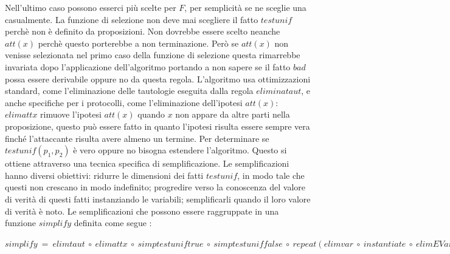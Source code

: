 \documentclass[12pt]{article}
\begin{document}
 Nell'ultimo caso possono esserci più scelte per $F$, per semplicità se ne sceglie una casualmente. La funzione di selezione non deve mai scegliere il fatto $testunif$ perchè non è definito da proposizioni. Non dovrebbe essere scelto neanche $att(x)$ perchè questo porterebbe a non terminazione. Però se $att(x)$ non venisse selezionata nel primo caso della funzione di selezione questa rimarrebbe invariata dopo l'applicazione dell'algoritmo portando a non sapere se il fatto $bad$ possa essere derivabile oppure no da questa regola. L'algoritmo usa ottimizzazioni standard, come l'eliminazione delle tautologie eseguita dalla regola $eliminataut$, e anche specifiche per i protocolli, come l'eliminazione dell'ipotesi $att(x)$: $elimattx$ rimuove l'ipotesi $att(x)$ quando $x$ non appare da altre parti nella proposizione, questo può essere fatto in quanto l'ipotesi risulta essere sempre vera finché l'attaccante risulta avere almeno un termine. Per determinare se $testunif(p_1,p_2)$ è vero oppure no bisogna estendere l'algoritmo. Questo si ottiene attraverso una tecnica specifica di semplificazione. Le semplificazioni hanno diversi obiettivi: ridurre le dimensioni dei fatti $testunif$, in modo tale che questi non crescano in modo indefinito; progredire verso la conoscenza del valore di verità di questi fatti instanziando le variabili; semplificarli quando il loro valore di verità è noto. Le semplificazioni che possono essere raggruppate in una funzione $simplify$ definita come segue :\\
 \begin{center}
     $simplify\ =\ elimtaut\ \circ \ elimattx\ \circ \ simptestuniftrue\ \circ \ simptestuniffalse\ \circ \ repeat(elimvar\ \circ \ instantiate\ \circ \ elimEVar\ \circ \ swap\ \circ \ unify) $
 \end{center}
 
\end{document}
